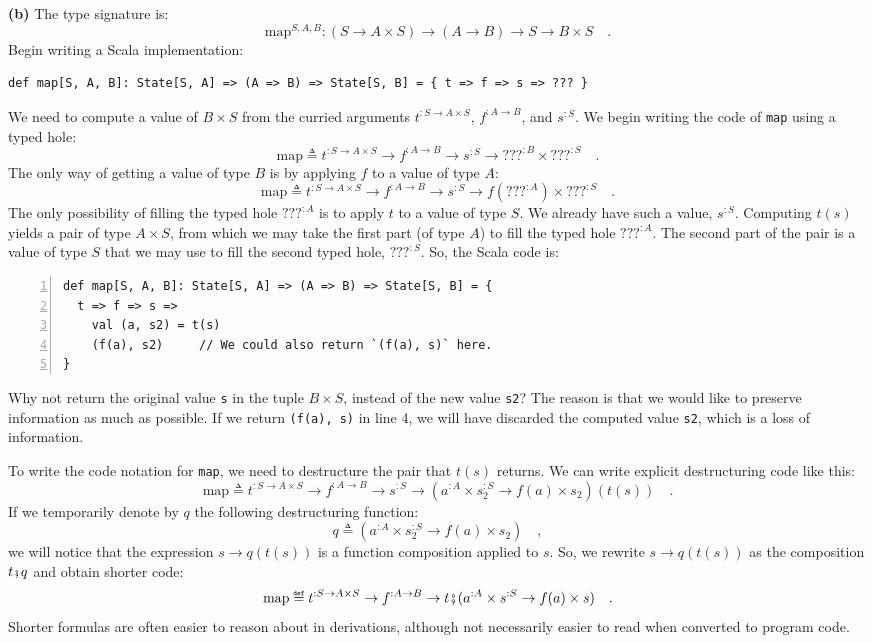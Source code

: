 \textbf{(b)} The type signature is:
\[
\text{map}^{S,A,B}:(S\rightarrow A\times S)\rightarrow(A\rightarrow B)\rightarrow S\rightarrow B\times S\quad.
\]
Begin writing a Scala implementation:
\begin{lstlisting}
def map[S, A, B]: State[S, A] => (A => B) => State[S, B] = { t => f => s => ??? }
\end{lstlisting}
We need to compute a value of $B\times S$ from the curried arguments
$t^{:S\rightarrow A\times S}$, $f^{:A\rightarrow B}$, and $s^{:S}$.
We begin writing the code of \lstinline!map! using a typed hole:
\[
\text{map}\triangleq t^{:S\rightarrow A\times S}\rightarrow f^{:A\rightarrow B}\rightarrow s^{:S}\rightarrow\text{???}^{:B}\times\text{???}^{:S}\quad.
\]
The only way of getting a value of type $B$ is by applying $f$ to
a value of type $A$:
\[
\text{map}\triangleq t^{:S\rightarrow A\times S}\rightarrow f^{:A\rightarrow B}\rightarrow s^{:S}\rightarrow f(\text{???}^{:A})\times\text{???}^{:S}\quad.
\]
The only possibility of filling the typed hole $\text{???}^{:A}$
is to apply $t$ to a value of type $S$. We already have such a value,
$s^{:S}$. Computing $t(s)$ yields a pair of type $A\times S$, from
which we may take the first part (of type $A$) to fill the typed
hole $\text{???}^{:A}$. The second part of the pair is a value of
type $S$ that we may use to fill the second typed hole, $\text{???}^{:S}$.
So, the Scala code is:
\begin{lstlisting}[numbers=left]
def map[S, A, B]: State[S, A] => (A => B) => State[S, B] = {
  t => f => s =>
    val (a, s2) = t(s)
    (f(a), s2)     // We could also return `(f(a), s)` here.
}
\end{lstlisting}
Why not return the original value \lstinline!s! in the tuple $B\times S$,
instead of the new value \lstinline!s2!? The reason is that we would
like to preserve information as much as possible. If we return \lstinline!(f(a), s)!
in line 4, we will have discarded the computed value \lstinline!s2!,
which is a loss of information.

To write the code notation for \lstinline!map!, we need to destructure
the pair that $t(s)$ returns. We can write explicit destructuring
code like this:
\[
\text{map}\triangleq t^{:S\rightarrow A\times S}\rightarrow f^{:A\rightarrow B}\rightarrow s^{:S}\rightarrow(a^{:A}\times s_{2}^{:S}\rightarrow f(a)\times s_{2})(t(s))\quad.
\]
If we temporarily denote by $q$ the following destructuring function:
\[
q\triangleq(a^{:A}\times s_{2}^{:S}\rightarrow f(a)\times s_{2})\quad,
\]
we will notice that the expression $s\rightarrow q(t(s))$ is a function
composition applied to $s$. So, we rewrite $s\rightarrow q(t(s))$
as the composition $t\bef q$ and obtain shorter code:
\[
\text{map}\triangleq t^{:S\rightarrow A\times S}\rightarrow f^{:A\rightarrow B}\rightarrow t\bef(a^{:A}\times s^{:S}\rightarrow f(a)\times s)\quad.
\]
Shorter formulas are often easier to reason about in derivations,
although not necessarily easier to read when converted to program
code.

